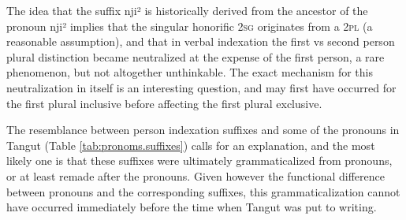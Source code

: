 \documentclass[oldfontcommands,oneside,a4paper,11pt]{article}
\newcommand{\ipa}[1]{{\phon \mbox{#1}}} %
\begin{document}
The idea that the suffix  \ipa{nji²} is historically derived from the ancestor of the pronoun  \ipa{nji²} implies that the singular honorific \textsc{2sg} originates from a \textsc{2pl} (a reasonable assumption), and that in verbal indexation the first vs second person plural distinction became neutralized at the expense of the first person, a rare phenomenon, but not altogether unthinkable. The exact mechanism for this neutralization in itself is an interesting question, and may first have occurred for the first plural inclusive before affecting the first plural exclusive.

The resemblance between person indexation suffixes and some of the pronouns in Tangut (Table \ref{tab:pronoms.suffixes}) calls for an explanation, and the most likely one is that these suffixes were ultimately  grammaticalized from pronouns, or at least remade after the pronouns. Given however the functional difference between pronouns and the corresponding suffixes, this grammaticalization cannot have occurred immediately before the time when Tangut was put to writing.
\end{document}
